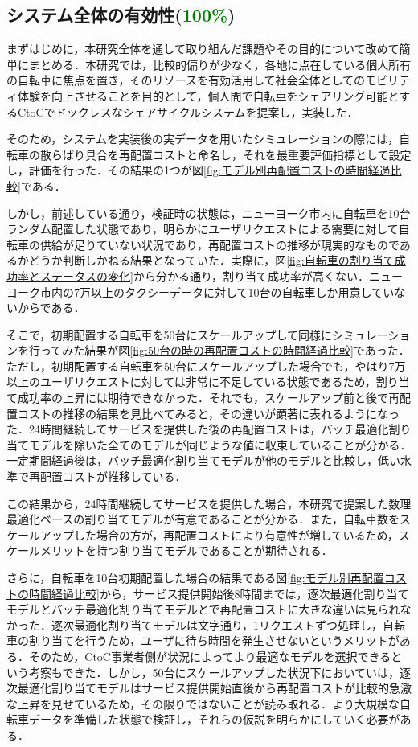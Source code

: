   \subsection{システム全体の有効性(\textcolor{green}{100\%})}
    \label{sec:システム全体の有効性}
      \par まずはじめに，本研究全体を通して取り組んだ課題やその目的について改めて簡単にまとめる．本研究では，比較的偏りが少なく，各地に点在している個人所有の自転車に焦点を置き，そのリソースを有効活用して社会全体としてのモビリティ体験を向上させることを目的として，個人間で自転車をシェアリング可能とするCtoCでドックレスなシェアサイクルシステムを提案し，実装した．
      \par そのため，システムを実装後の実データを用いたシミュレーションの際には，自転車の散らばり具合を再配置コストと命名し，それを最重要評価指標として設定し，評価を行った．その結果の1つが図\ref{fig:モデル別再配置コストの時間経過比較}である．
      \par しかし，前述している通り，検証時の状態は，ニューヨーク市内に自転車を10台ランダム配置した状態であり，明らかにユーザリクエストによる需要に対して自転車の供給が足りていない状況であり，再配置コストの推移が現実的なものであるかどうか判断しかねる結果となっていた．実際に，図\ref{fig:自転車の割り当て成功率とステータスの変化}から分かる通り，割り当て成功率が高くない．ニューヨーク市内の7万以上のタクシーデータに対して10台の自転車しか用意していないからである．
      \par そこで，初期配置する自転車を50台にスケールアップして同様にシミュレーションを行ってみた結果が図\ref{fig:50台の時の再配置コストの時間経過比較}であった．ただし，初期配置する自転車を50台にスケールアップした場合でも，やはり7万以上のユーザリクエストに対しては非常に不足している状態であるため，割り当て成功率の上昇には期待できなかった．それでも，スケールアップ前と後で再配置コストの推移の結果を見比べてみると，その違いが顕著に表れるようになった．24時間継続してサービスを提供した後の再配置コストは，バッチ最適化割り当てモデルを除いた全てのモデルが同じような値に収束していることが分かる．一定期間経過後は，バッチ最適化割り当てモデルが他のモデルと比較し，低い水準で再配置コストが推移している．
      \par この結果から，24時間継続してサービスを提供した場合，本研究で提案した数理最適化ベースの割り当てモデルが有意であることが分かる．また，自転車数をスケールアップした場合の方が，再配置コストにより有意性が増しているため，スケールメリットを持つ割り当てモデルであることが期待される．
      \par さらに，自転車を10台初期配置した場合の結果である図\ref{fig:モデル別再配置コストの時間経過比較}から，サービス提供開始後8時間までは，逐次最適化割り当てモデルとバッチ最適化割り当てモデルとで再配置コストに大きな違いは見られなかった．逐次最適化割り当てモデルは文字通り，1リクエストずつ処理し，自転車の割り当てを行うため，ユーザに待ち時間を発生させないというメリットがある．そのため，CtoC事業者側が状況によってより最適なモデルを選択できるという考察もできた．しかし，50台にスケールアップした状況下においていは，逐次最適化割り当てモデルはサービス提供開始直後から再配置コストが比較的急激な上昇を見せているため，その限りではないことが読み取れる．より大規模な自転車データを準備した状態で検証し，それらの仮説を明らかにしていく必要がある．
